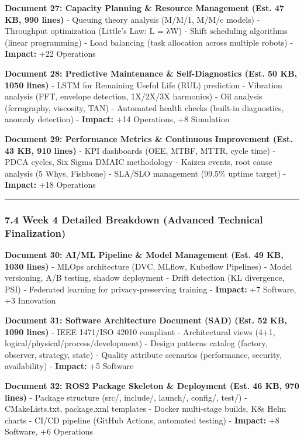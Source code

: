 \documentclass[
]{article}
\begin{document}
\textbf{Document 27: Capacity Planning \& Resource Management (Est. 47
KB, 990 lines)} - Queuing theory analysis (M/M/1, M/M/c models) -
Throughput optimization (Little's Law: L = λW) - Shift scheduling
algorithms (linear programming) - Load balancing (task allocation across
multiple robots) - \textbf{Impact:} +22 Operations

\textbf{Document 28: Predictive Maintenance \& Self-Diagnostics (Est. 50
KB, 1050 lines)} - LSTM for Remaining Useful Life (RUL) prediction -
Vibration analysis (FFT, envelope detection, 1X/2X/3X harmonics) - Oil
analysis (ferrography, viscosity, TAN) - Automated health checks
(built-in diagnostics, anomaly detection) - \textbf{Impact:} +14
Operations, +8 Simulation

\textbf{Document 29: Performance Metrics \& Continuous Improvement (Est.
43 KB, 910 lines)} - KPI dashboards (OEE, MTBF, MTTR, cycle time) - PDCA
cycles, Six Sigma DMAIC methodology - Kaizen events, root cause analysis
(5 Whys, Fishbone) - SLA/SLO management (99.5\% uptime target) -
\textbf{Impact:} +18 Operations

\begin{center}\rule{0.5\linewidth}{0.5pt}\end{center}

\hypertarget{week-4-detailed-breakdown-advanced-technical-finalization}{%
\subsubsection{7.4 Week 4 Detailed Breakdown (Advanced Technical
Finalization)}\label{week-4-detailed-breakdown-advanced-technical-finalization}}

\textbf{Document 30: AI/ML Pipeline \& Model Management (Est. 49 KB,
1030 lines)} - MLOps architecture (DVC, MLflow, Kubeflow Pipelines) -
Model versioning, A/B testing, shadow deployment - Drift detection (KL
divergence, PSI) - Federated learning for privacy-preserving training -
\textbf{Impact:} +7 Software, +3 Innovation

\textbf{Document 31: Software Architecture Document (SAD) (Est. 52 KB,
1090 lines)} - IEEE 1471/ISO 42010 compliant - Architectural views (4+1,
logical/physical/process/development) - Design patterns catalog
(factory, observer, strategy, state) - Quality attribute scenarios
(performance, security, availability) - \textbf{Impact:} +5 Software

\textbf{Document 32: ROS2 Package Skeleton \& Deployment (Est. 46 KB,
970 lines)} - Package structure (src/, include/, launch/, config/,
test/) - CMakeLists.txt, package.xml templates - Docker multi-stage
builds, K8s Helm charts - CI/CD pipeline (GitHub Actions, automated
testing) - \textbf{Impact:} +8 Software, +6 Operations
\end{document}
